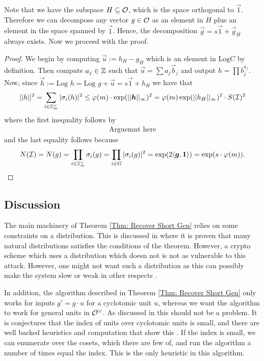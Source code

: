 Note that we have the subspace \(H\subseteq \mathcal{O}\), which is the space orthogonal to \(\vec{1}\). Therefore we can decompose any vector \(g\in\mathcal{O}\) as an element in \(H\) plus an element in the space spanned by \(\vec{1}\). Hence, the decomposition \(\vec{g} = s\vec{1} + \vec{g}_H\) always exists. Now we proceed with the proof.
\begin{proof}
    We begin by computing \(\vec{u} := h_H - g_H\) which is an element in \(\text{Log} C\) by definition. Then compute \(a_j\in\mathbb{Z}\) such that \(\vec{u} = \sum a_j\vec{b}_j\) and output \(h = \prod b_j^{a_j}\). Now, since \(\vec{h} := \text{Log }h = \text{Log }g + \vec{u} = s\vec{1} + h_H\) we have that
    \begin{align*}
        ||h||^2 = \sum\limits_{i\in\mathbb{Z}^\vee_m}|\sigma_i (h)|^2 \leq \varphi(m)\cdot\exp(||\boldsymbol{h}||_\infty)^2 = \varphi(m)\exp (||h_H||_\infty)^2\cdot S(\mathcal{I}
        )^2
    \end{align*}
    where the first inequality follows by
    \begin{align*}
        \text{Arguemnt here}
    \end{align*}
    and the last equality follows because
    \begin{align*}
        N(\mathcal{I}) = N(g) = \prod\limits_{i\in\mathbb{Z}^\vee_m}\sigma_i (g) = \prod\limits_{i\in G}|\sigma_i(g)|^2 = \exp (2\langle\boldsymbol{g}, \boldsymbol{1}\rangle) = \exp (s\cdot\varphi (m)).
    \end{align*}
\end{proof}
\subsection{Discussion}
The main machinery of Theorem \ref{Thm: Recover Short Gen} relies on some constraints on a distribution. This is discussed in \cite{Recover Short Gen} where it is proven that many natural distributions satisfies the conditions of the theorem. However, a crypto scheme which uses a distribution which doesn not is not as vulnerable to this attack. However, one might not want such a distribution as this can possibly make the system slow or weak in other respects .\par
In addition, the algorithm described in Theorem \ref{Thm: Recover Short Gen} only works for inputs \(g' = g\cdot u\) for a cyclotomic unit \(u\), whereas we want the algorithm to work for general units in \(\mathcal{O}^\vee\). As discussed in \cite{Recover Short Gen} this should not be a problem. It is conjectures that the index of units over cyclotomic units is small, and there are well backed heuristics and computation that show this . If the index is small, we can enumerate over the cosets, which there are few of, and run the algorithm a number of times equal the index. This is the only heuristic in this algorithm.\par